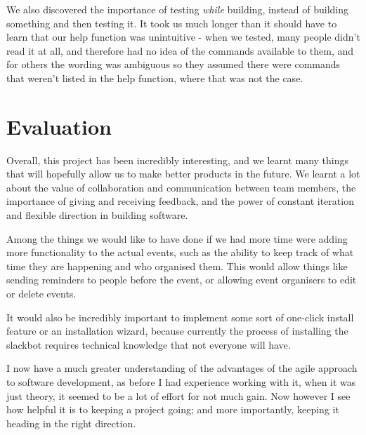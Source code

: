 \documentclass[12pt]{report}
\begin{document}
We also discovered the importance of testing \emph{while} building, instead of building something and then testing it. It took us much longer than it should have to learn that our help function was unintuitive - when we tested, many people didn't read it at all, and therefore had no idea of the commands available to them, and for others the wording was ambiguous so they assumed there were commands that weren't listed in the help function, where that was not the case.

\chapter{Evaluation}\label{evaluation}
Overall, this project has been incredibly interesting, and we learnt many things that will hopefully allow us to make better products in the future. We learnt a lot about the value of collaboration and communication between team members, the importance of giving and receiving feedback, and the power of constant iteration and flexible direction in building software.

\vspace{3mm}

Among the things we would like to have done if we had more time were adding more functionality to the actual events, such as the ability to keep track of what time they are happening and who organised them. This would allow things like sending reminders to people before the event, or allowing event organisers to edit or delete events.

\vspace{3mm}

It would also be incredibly important to implement some sort of one-click install feature or an installation wizard, because currently the process of installing the slackbot requires technical knowledge that not everyone will have.

\vspace{3mm}

I now have a much greater understanding of the advantages of the agile approach to software development, as before I had experience working with it, when it was just theory, it seemed to be a lot of effort for not much gain. Now however I see how helpful it is to keeping a project going; and more importantly, keeping it heading in the right direction.
\end{document}
